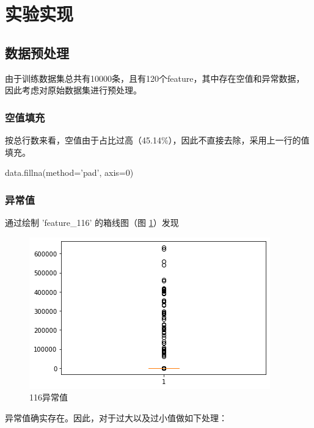 \documentclass[UTF8,a4paper,AutoFakeBold,AutoFakeSlant]{article}
\begin{document}


\section{实验实现}


\subsection{数据预处理}

由于训练数据集总共有10000条，且有120个feature，其中存在空值和异常数据，因此考虑对原始数据集进行预处理。


\subsubsection{空值填充}

按总行数来看，空值由于占比过高（45.14\%），因此不直接去除，采用上一行的值填充。
\begin{python}
  data.fillna(method='pad', axis=0)
\end{python}


\subsubsection{异常值}

通过绘制 'feature\_116' 的箱线图（图 \ref{f:异常值}）发现
\begin{figure}[htbp]
	\centering
	\includegraphics[scale=0.625]{异常值.png}
	\caption{116异常值}
	\label{f:异常值}
\end{figure}
异常值确实存在。因此，对于过大以及过小值做如下处理：
\end{document}
